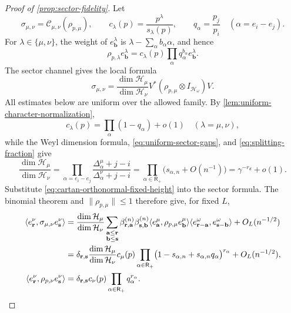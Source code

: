 \documentclass[11pt]{article}
\theoremstyle{remark}
\theoremstyle{plain}
\newcommand{\cC}{\mathcal C}
\newcommand{\cH}{\mathcal H}
\newcommand{\ot}{\otimes}
\begin{document}
\begin{proof}[Proof of \cref{prop:sector-fidelity}]
Let
\[
  \sigma_{\mu,\nu}=\cC_{\mu,\nu}(\rho_{p,\mu}),
  \qquad
  c_\lambda(p)=\frac{p^\lambda}{s_\lambda(p)},
  \qquad
  q_\alpha=\frac{p_j}{p_i}\quad(\alpha=e_i-e_j).
\]
For \(\lambda\in\{\mu,\nu\}\), the weight of
\(e_{\mathbf b}^\lambda\) is
\(\lambda-\sum_\alpha b_\alpha\alpha\), and hence
\[
  \rho_{p,\lambda}e_{\mathbf b}^\lambda
  =c_\lambda(p)\prod_\alpha q_\alpha^{b_\alpha}e_{\mathbf b}^\lambda.
\]
The sector channel gives the local formula
\[
  \sigma_{\mu,\nu}
  =\frac{\dim\cH_\mu}{\dim\cH_\nu}
   V^*(\rho_{p,\mu}\ot I_{\cH_\omega})V.
\]
All estimates below are uniform over the allowed family.
By \cref{lem:uniform-character-normalization},
\[
  c_\lambda(p)=\prod_\alpha(1-q_\alpha)+o(1)
  \quad(\lambda=\mu,\nu),
\]
while the Weyl dimension formula, \eqref{eq:uniform-sector-gaps}, and
\eqref{eq:splitting-fraction} give
\[
  \frac{\dim\cH_\mu}{\dim\cH_\nu}
  =\prod_{\alpha=e_i-e_j}
    \frac{\Delta_\alpha^\mu+j-i}{\Delta_\alpha^\nu+j-i}
  =\prod_{\alpha\in\mathsf R_+}
    \bigl(s_{\alpha,n}+O(n^{-1})\bigr)
  =\gamma^{-r_d}+o(1).
\]
Substitute \eqref{eq:cartan-orthonormal-fixed-height} into the sector
formula.  The binomial theorem
and \(\|\rho_{p,\mu}\|\le1\) therefore give, for fixed \(L\),
\begin{align}
  \langle e_{\mathbf r}^\nu,
    \sigma_{\mu,\nu}e_{\mathbf s}^\nu\rangle
  &={}\frac{\dim\cH_\mu}{\dim\cH_\nu}
  \sum_{\substack{\mathbf a\le\mathbf r\\
                   \mathbf b\le\mathbf s}}
  \beta_{\mathbf r,\mathbf a}^{(n)}
  \beta_{\mathbf s,\mathbf b}^{(n)}
  \langle e_{\mathbf a}^\mu,
    \rho_{p,\mu}e_{\mathbf b}^\mu\rangle
  \langle e_{\mathbf r-\mathbf a}^\omega,
    e_{\mathbf s-\mathbf b}^\omega\rangle
  +O_L(n^{-1/2})\notag\\
  &={}
  \delta_{\mathbf r,\mathbf s}
  \frac{\dim\cH_\mu}{\dim\cH_\nu}c_\mu(p)
  \prod_{\alpha\in\mathsf R_+}
  \bigl(1-s_{\alpha,n}+s_{\alpha,n}q_\alpha\bigr)^{r_\alpha}
  +O_L(n^{-1/2}),
  \label{eq:sector-output-fixed-matrix}\\
  \langle e_{\mathbf r}^\nu,
    \rho_{p,\nu}e_{\mathbf s}^\nu\rangle
  &=\delta_{\mathbf r,\mathbf s}
    c_\nu(p)\prod_{\alpha\in\mathsf R_+}q_\alpha^{r_\alpha}.
  \label{eq:sector-target-fixed-matrix}
\end{align}


\end{proof}
\end{document}
